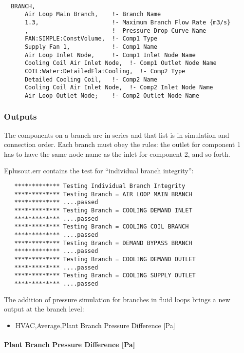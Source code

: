 \begin{lstlisting}

  BRANCH,
      Air Loop Main Branch,    !- Branch Name
      1.3,                     !- Maximum Branch Flow Rate {m3/s}
      ,                        !- Pressure Drop Curve Name
      FAN:SIMPLE:ConstVolume,  !- Comp1 Type
      Supply Fan 1,            !- Comp1 Name
      Air Loop Inlet Node,     !- Comp1 Inlet Node Name
      Cooling Coil Air Inlet Node,  !- Comp1 Outlet Node Name
      COIL:Water:DetailedFlatCooling,  !- Comp2 Type
      Detailed Cooling Coil,   !- Comp2 Name
      Cooling Coil Air Inlet Node,  !- Comp2 Inlet Node Name
      Air Loop Outlet Node;    !- Comp2 Outlet Node Name
\end{lstlisting}

\subsubsection{Outputs}\label{outputs-2-014}

The components on a branch are in series and that list is in simulation and connection order. Each branch must obey the rules: the outlet for component 1 has to have the same node name as the inlet for component 2, and so forth.

Eplusout.err contains the test for ``individual branch integrity'':

\begin{lstlisting}
   ************* Testing Individual Branch Integrity
   ************* Testing Branch = AIR LOOP MAIN BRANCH
   ************* ....passed
   ************* Testing Branch = COOLING DEMAND INLET
   ************* ....passed
   ************* Testing Branch = COOLING COIL BRANCH
   ************* ....passed
   ************* Testing Branch = DEMAND BYPASS BRANCH
   ************* ....passed
   ************* Testing Branch = COOLING DEMAND OUTLET
   ************* ....passed
   ************* Testing Branch = COOLING SUPPLY OUTLET
   ************* ....passed
\end{lstlisting}

The addition of pressure simulation for branches in fluid loops brings a new output at the branch level:

\begin{itemize}
\tightlist
\item
  HVAC,Average,Plant Branch Pressure Difference {[}Pa{]}
\end{itemize}

\paragraph{Plant Branch Pressure Difference {[}Pa{]}}\label{plant-branch-pressure-difference-pa}

